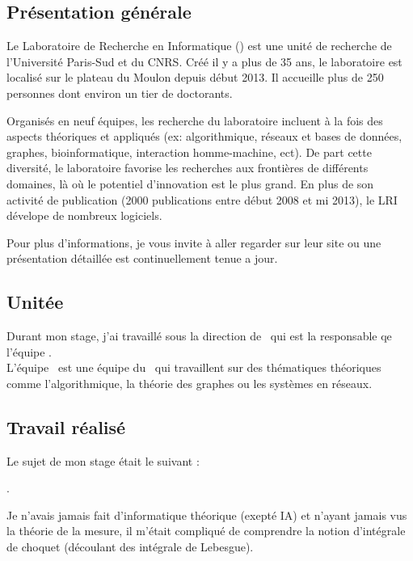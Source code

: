 
\subsection*{Présentation générale}
Le Laboratoire de Recherche en Informatique (\lri) est une unité de recherche de l'Université Paris-Sud et du \textsc{CNRS}.
Créé il y a plus de 35 ans, le laboratoire est localisé sur le plateau du Moulon depuis début 2013.
Il accueille plus de 250 personnes dont environ un tier de doctorants.


Organisés en neuf équipes, les recherche du laboratoire incluent à la fois des aspects théoriques et appliqués (ex: algorithmique, réseaux et bases de données, graphes, bioinformatique, interaction homme-machine, ect).
De part cette diversité, le laboratoire favorise les recherches aux frontières de différents domaines, là où le potentiel d'innovation est le plus grand.
En plus de son activité de publication (2000 publications entre début 2008 et mi 2013), le LRI dévelope de nombreux logiciels.


Pour plus d'informations, je vous invite à aller regarder sur leur site ou une présentation détaillée est continuellement tenue a jour\cite{LRI}.


\subsection*{Unitée \galac}

Durant mon stage, j'ai travaillé sous la direction de \johanne\ qui est la responsable qe l'équipe \galac. \\
L'équipe \galac\ est une équipe du \lri\ qui travaillent sur des thématiques théoriques comme
l'algorithmique, la théorie des graphes ou les systèmes en réseaux.

\subsection*{Travail réalisé}
Le sujet de mon stage était le suivant :
\begin{center}
    \textit{\sujet}.
\end{center}
Je n'avais jamais fait d'informatique théorique (exepté IA) et n'ayant jamais vus la théorie de la mesure, il m'était compliqué de comprendre la notion d'intégrale de choquet (découlant des intégrale de Lebesgue).
